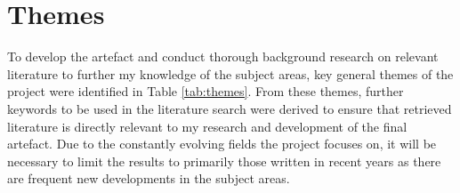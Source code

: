 \documentclass[12pt]{report}
\begin{document}
    \section{Themes}

    To develop the artefact and conduct thorough background research on relevant literature to further my 
    knowledge of the subject areas, key general themes of the project were identified in Table \ref{tab:themes}. From these themes, further 
    keywords to be used in the literature search were derived to ensure that retrieved literature is directly relevant 
    to my research and development of the final artefact. Due to the constantly evolving fields the project focuses 
    on, it will be necessary to limit the results to primarily those written in recent years as there are 
    frequent new developments in the subject areas.
\end{document}
